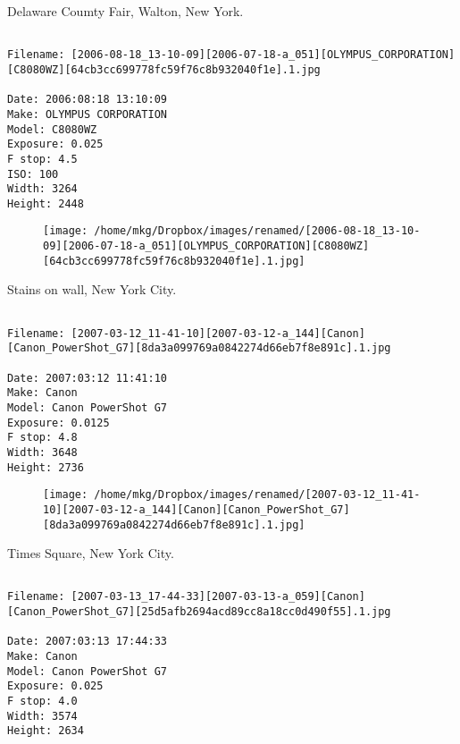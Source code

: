 \clearpage
\onecolumn
\noindent Delaware Coumty Fair, Walton, New York.
\noindent
\begin{lstlisting}

Filename: [2006-08-18_13-10-09][2006-07-18-a_051][OLYMPUS_CORPORATION][C8080WZ][64cb3cc699778fc59f76c8b932040f1e].1.jpg

Date: 2006:08:18 13:10:09
Make: OLYMPUS CORPORATION
Model: C8080WZ
Exposure: 0.025
F stop: 4.5
ISO: 100
Width: 3264
Height: 2448
\end{lstlisting}
\clearpage

\begin{figure}
\texttt{[image: /home/mkg/Dropbox/images/renamed/[2006-08-18\_13-10-09][2006-07-18-a\_051][OLYMPUS\_CORPORATION][C8080WZ][64cb3cc699778fc59f76c8b932040f1e].1.jpg]}
\end{figure}
    
\clearpage
\onecolumn
\noindent Stains on wall, New York City.
\noindent
\begin{lstlisting}

Filename: [2007-03-12_11-41-10][2007-03-12-a_144][Canon][Canon_PowerShot_G7][8da3a099769a0842274d66eb7f8e891c].1.jpg

Date: 2007:03:12 11:41:10
Make: Canon
Model: Canon PowerShot G7
Exposure: 0.0125
F stop: 4.8
Width: 3648
Height: 2736
\end{lstlisting}
\clearpage

\begin{figure}
\texttt{[image: /home/mkg/Dropbox/images/renamed/[2007-03-12\_11-41-10][2007-03-12-a\_144][Canon][Canon\_PowerShot\_G7][8da3a099769a0842274d66eb7f8e891c].1.jpg]}
\end{figure}
    
\clearpage
\onecolumn
\noindent Times Square, New York City.
\noindent
\begin{lstlisting}

Filename: [2007-03-13_17-44-33][2007-03-13-a_059][Canon][Canon_PowerShot_G7][25d5afb2694acd89cc8a18cc0d490f55].1.jpg

Date: 2007:03:13 17:44:33
Make: Canon
Model: Canon PowerShot G7
Exposure: 0.025
F stop: 4.0
Width: 3574
Height: 2634
\end{lstlisting}
\clearpage

